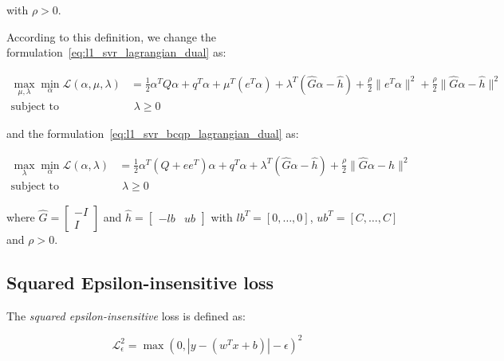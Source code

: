 with $\rho > 0$.

\bigskip

According to this definition, we change the formulation~\ref{eq:l1_svr_lagrangian_dual} as:

\begin{equation} \label{eq:l1_svr_aug_lagrangian_dual}
	\begin{aligned}
		    \max_{\mu,\lambda} \min_{\alpha} \mathcal{L}(\alpha,\mu,\lambda) &= \frac{1}{2} \alpha^T Q\alpha+q^T\alpha + \mu^T (e^T \alpha) + \lambda^T (\hat{G} \alpha - \hat{h}) + \frac{\rho}{2} \| e^T \alpha \|^2 + \frac{\rho}{2} \| \hat{G} \alpha - \hat{h} \|^2 \\
    \text{subject to} \quad & \,\, \lambda \geq 0
	\end{aligned}
\end{equation}

and the formulation~\ref{eq:l1_svr_bcqp_lagrangian_dual} as:

\begin{equation} \label{eq:l1_svr_bcqp_aug_lagrangian_dual}
	\begin{aligned}
    	\max_{\lambda} \min_{\alpha} \mathcal{L}(\alpha,\lambda) &= \frac{1}{2} \alpha^T (Q + ee^T) \alpha + q^T \alpha + \lambda^T (\hat{G} \alpha - \hat{h}) + \frac{\rho}{2} \| \hat{G} \alpha - \hat{h} \|^2 \\
    \text{subject to} \quad & \,\, \lambda \geq 0
	\end{aligned}
\end{equation}

where $\hat{G} =
\begin{bmatrix}
-I \\
 I 
\end{bmatrix}$ and $\hat{h} =
\begin{bmatrix}
-lb & ub
\end{bmatrix}$ with $lb^T = [0, \dots, 0]$, $ub^T = [C, \dots, C]$ and $\rho > 0$.

\pagebreak

\subsection{Squared Epsilon-insensitive loss}

The \emph{squared epsilon-insensitive} loss is defined as:

\begin{equation} \label{eq:squared_eps_loss1}
	\mathcal{L}_\epsilon^2 = \max(0, |y - (w^T x + b)| - \epsilon)^2
\end{equation}

